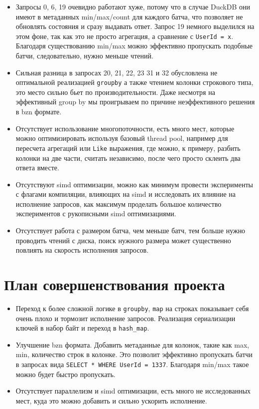 \documentclass[a4paper,12pt]{extarticle}
\begin{document}
 
\begin{itemize}
    \item Запросы 0, 6, 19 очевидно работают хуже, потому что в случае DuckDB они
    имеют в метаданных min/max/count для каждого батча, что позволяет не
    обновлять состояния и сразу выдавать ответ. Запрос 19 немного выделился на этом фоне,
    так как это не просто агрегация, а сравнение с \texttt{UserId = x}. Благодаря существованию
    min/max можно эффективно пропускать подобные батчи, следовательно, нужно
    меньше чтений.
    \item Сильная разница в запросах 20, 21, 22, 23 31 и 32
    обусловлена не оптимальной реализацией \texttt{groupby}
    а также чтением колонки строкового типа, это место сильно бьет по производительности.
    Даже несмотря на эффективный group by мы проигрываем по причине неэффективного решения
    в bzn формате.
    \item Отсутствует использование многопоточности, есть много мест, которые можно
    оптимизировать используя базовый thread pool, например для пересчета агрегаций
    или \texttt{Like} выражения, где можно, к примеру, разбить колонки на две части, считать
    независимо, после чего просто склеить два ответа вместе.
    \item Отсутствуют simd оптимизации, можно как минимум провести эксперименты с флагами
    компиляции, влияющих на simd и исследовать их влияние на исполнение запросов,
    как максимум проделать большое количество экспериментов с рукописными simd оптимизациями.
    \item Отсутствует работа с размером батча, чем меньше батч, тем больше нужно проводить
    чтений с диска, 
    поиск нужного размера может существенно повлиять на скорость исполнения
    запросов.
\end{itemize}

\section{План совершенствования проекта}

\begin{itemize}
    \item Переход к более сложной логике в \texttt{groupby}, \texttt{map} на строках показывает
     себя очень плохо и тормозит исполнение запросов. Реализация сериализации
     ключей в набор байт и переход в \texttt{hash\_map}.
    \item Улучшение bzn формата. Добавить метаданные
        для колонок, такие как max, min, количество строк в колонке.
        Это позволит эффективно пропускать батчи в запросах вида
        \texttt{SELECT * WHERE UserId = 1337}. Благодаря min/max такое можно будет
        быстро пропускать.
    \item Отсутствует параллелизм и simd оптимизации, есть много не исследованных мест,
    куда это можно добавить и сильно ускорить исполнение.
\end{itemize}
\end{document}

